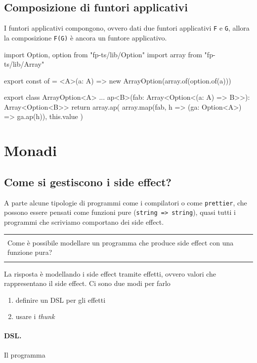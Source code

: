 \documentclass[12pt]{article}
\theoremstyle{definition}
\newenvironment{demo}
    {\begin{center}
    \begin{tabular}{|p{0.9\textwidth}|}
    \hline\\
    }
    {
    \\\\\hline
    \end{tabular}
    \end{center}
    }
\newenvironment{code}
  {\vspace{0.5cm} \VerbatimEnvironment\begin{typescriptcode}}
  {\end{typescriptcode} \vspace{0.2cm}}
\begin{document}
\subsection{Composizione di funtori applicativi}

I funtori applicativi compongono, ovvero dati due funtori applicativi \texttt{F} e \texttt{G},
allora la composizione \texttt{F(G)} è ancora un funtore applicativo.

\begin{code}
import { Option, option } from "fp-ts/lib/Option"
import { array } from "fp-ts/lib/Array"

export const of = <A>(a: A) =>
  new ArrayOption(array.of(option.of(a)))

export class ArrayOption<A> {
  ...
  ap<B>(fab: Array<Option<(a: A) => B>>): Array<Option<B>> {
    return array.ap(
      array.map(fab, h => (ga: Option<A>) => ga.ap(h)),
      this.value
    )
  }
}
\end{code}

\newpage

\section{Monadi}

\subsection{Come si gestiscono i side effect?}

A parte alcune tipologie di programmi come i compilatori o come \texttt{prettier}, che possono essere pensati come funzioni pure (\texttt{string => string}),
quasi tutti i programmi che scriviamo comportano dei side effect.

\begin{demo}
Come è possibile modellare un programma che produce side effect con una funzione pura?
\end{demo}

La risposta è modellando i side effect tramite effetti, ovvero valori che rappresentano il side effect. Ci sono due modi per farlo

\begin{enumerate}
  \item definire un DSL per gli effetti
  \item usare i \emph{thunk}
\end{enumerate}

\paragraph{DSL.} Il programma
\end{document}

